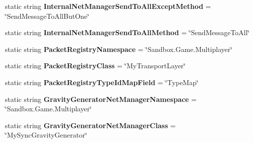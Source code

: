 \begin{DoxyCompactItemize}
\item 
\hypertarget{class_s_e_mod_a_p_i_internal_1_1_a_p_i_1_1_common_1_1_network_manager_a9968d45a49198bf7a7e7a0a64e5a5156}{}static string {\bfseries Internal\+Net\+Manager\+Send\+To\+All\+Except\+Method} = \char`\"{}Send\+Message\+To\+All\+But\+One\char`\"{}\label{class_s_e_mod_a_p_i_internal_1_1_a_p_i_1_1_common_1_1_network_manager_a9968d45a49198bf7a7e7a0a64e5a5156}

\item 
\hypertarget{class_s_e_mod_a_p_i_internal_1_1_a_p_i_1_1_common_1_1_network_manager_a6797a9aeb07afcf534cefdf54264b7e0}{}static string {\bfseries Internal\+Net\+Manager\+Send\+To\+All\+Method} = \char`\"{}Send\+Message\+To\+All\char`\"{}\label{class_s_e_mod_a_p_i_internal_1_1_a_p_i_1_1_common_1_1_network_manager_a6797a9aeb07afcf534cefdf54264b7e0}

\item 
\hypertarget{class_s_e_mod_a_p_i_internal_1_1_a_p_i_1_1_common_1_1_network_manager_ad3ce80f382944212b58810310c35e1a7}{}static string {\bfseries Packet\+Registry\+Namespace} = \char`\"{}Sandbox.\+Game.\+Multiplayer\char`\"{}\label{class_s_e_mod_a_p_i_internal_1_1_a_p_i_1_1_common_1_1_network_manager_ad3ce80f382944212b58810310c35e1a7}

\item 
\hypertarget{class_s_e_mod_a_p_i_internal_1_1_a_p_i_1_1_common_1_1_network_manager_aa152c26d73ee1ba4101d82adcacec603}{}static string {\bfseries Packet\+Registry\+Class} = \char`\"{}My\+Transport\+Layer\char`\"{}\label{class_s_e_mod_a_p_i_internal_1_1_a_p_i_1_1_common_1_1_network_manager_aa152c26d73ee1ba4101d82adcacec603}

\item 
\hypertarget{class_s_e_mod_a_p_i_internal_1_1_a_p_i_1_1_common_1_1_network_manager_ae2150686d84ad31714e293cc1d9f6641}{}static string {\bfseries Packet\+Registry\+Type\+Id\+Map\+Field} = \char`\"{}Type\+Map\char`\"{}\label{class_s_e_mod_a_p_i_internal_1_1_a_p_i_1_1_common_1_1_network_manager_ae2150686d84ad31714e293cc1d9f6641}

\item 
\hypertarget{class_s_e_mod_a_p_i_internal_1_1_a_p_i_1_1_common_1_1_network_manager_ae9089cb00aa33bdfe94474e70c8616a1}{}static string {\bfseries Gravity\+Generator\+Net\+Manager\+Namespace} = \char`\"{}Sandbox.\+Game.\+Multiplayer\char`\"{}\label{class_s_e_mod_a_p_i_internal_1_1_a_p_i_1_1_common_1_1_network_manager_ae9089cb00aa33bdfe94474e70c8616a1}

\item 
\hypertarget{class_s_e_mod_a_p_i_internal_1_1_a_p_i_1_1_common_1_1_network_manager_adc803a98cb9fcc4009a9b33e2b0e4c5c}{}static string {\bfseries Gravity\+Generator\+Net\+Manager\+Class} = \char`\"{}My\+Sync\+Gravity\+Generator\char`\"{}\label{class_s_e_mod_a_p_i_internal_1_1_a_p_i_1_1_common_1_1_network_manager_adc803a98cb9fcc4009a9b33e2b0e4c5c}


\end{DoxyCompactItemize}
